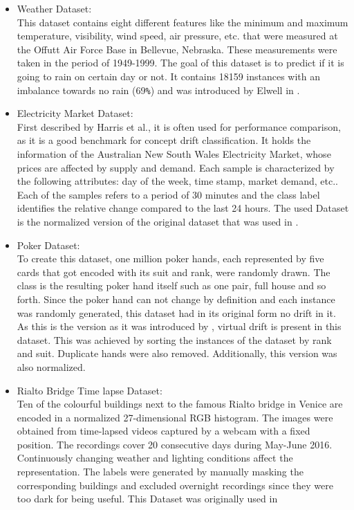 \documentclass[12pt,oneside,a4paper,parskip]{scrbook}
\begin{document}
\begin{itemize}
  \item Weather Dataset: \\
        This dataset contains eight different features like the minimum and maximum temperature, visibility, wind speed, 
        air pressure, etc. that were measured at the Offutt Air Force Base in Bellevue, Nebraska. These measurements were
        taken in the period of 1949-1999. The goal of this dataset is to predict if it is going to rain on certain day or not.
        It contains 18159 instances with an imbalance towards no rain (69\verb|%|) and was introduced by Elwell in \cite{weather}.

  \item Electricity Market Dataset:\\
        First described by Harris et al., it is often used for performance comparison, as it is a good benchmark for concept drift 
        classification. It holds the information of the Australian New South Wales Electricity Market, whose prices are affected 
        by supply and demand. Each sample is characterized by the following attributes: day of the week, time stamp, market demand,
        etc.. Each of the samples refers to a period of 30 minutes and the class label identiﬁes the relative change compared to the
        last 24 hours. The used Dataset is the normalized version of the original dataset that was used in \cite{MLonDataStreams}.

  \item Poker Dataset: \\
        To create this dataset, one million poker hands, each represented by five cards that got encoded with its suit and rank, 
        were randomly drawn. The class is the resulting poker hand itself such as one pair, full house and so forth.
        Since the poker hand can not change by definition and each instance was randomly generated, this dataset had 
        in its original form no drift in it.
        As this is the version as it was introduced by \cite{bifet2013efficient}, virtual drift is present in this dataset. 
        This was achieved by sorting the instances of the dataset by rank and suit. Duplicate hands were also removed.
        Additionally, this version was also normalized.

  \item Rialto Bridge Time lapse Dataset: \\
        Ten of the colourful buildings next to the famous Rialto bridge in Venice are encoded in a normalized 
        27-dimensional RGB histogram. The images were obtained from time-lapsed videos captured by a webcam with a fixed
        position. The recordings cover 20 consecutive days during May-June 2016. Continuously changing weather and 
        lighting conditions affect the representation. The labels were generated by manually masking the corresponding 
        buildings and excluded overnight recordings since they were too dark for being useful. 
        This Dataset was originally used in \cite{movingsquaresChessboardRialtobridge}
\end{itemize}
\end{document}
